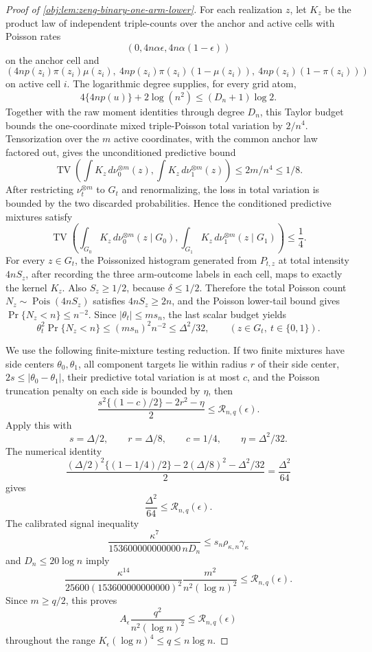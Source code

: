 \begin{proof}[Proof of \cref{obj:lem:zeng-binary-one-arm-lower}]
For each realization \(z\), let \(K_z\) be the product law of independent triple-counts over the anchor and active cells with Poisson rates
\[
(0,4n\alpha\epsilon,4n\alpha(1-\epsilon))
\]
on the anchor cell and
\[
(4n p(z_i)\pi(z_i)\mu(z_i),\ 4n p(z_i)\pi(z_i)(1-\mu(z_i)),\ 4n p(z_i)(1-\pi(z_i)))
\]
on active cell \(i\).  The logarithmic degree supplies, for every grid atom,
\[
4\{4n p(u)\}+2\log(n^2)
\le (D_n+1)\log 2 .
\]
Together with the raw moment identities through degree \(D_n\), this Taylor budget bounds the one-coordinate mixed triple-Poisson total variation by \(2/n^4\).  Tensorization over the \(m\) active coordinates, with the common anchor law factored out, gives the unconditioned predictive bound
\[
\operatorname{TV}\left(
\int K_z\,d\nu_0^{\otimes m}(z),
\int K_z\,d\nu_1^{\otimes m}(z)
\right)
\le 2m/n^4\le 1/8 .
\]
After restricting \(\nu_t^{\otimes m}\) to \(G_t\) and renormalizing, the loss in total variation is bounded by the two discarded probabilities.  Hence the conditioned predictive mixtures satisfy
\[
\operatorname{TV}\left(
\int_{G_0} K_z\,d\nu_0^{\otimes m}(z\mid G_0),
\int_{G_1} K_z\,d\nu_1^{\otimes m}(z\mid G_1)
\right)
\le \frac14 .
\]
For every \(z\in G_t\), the Poissonized histogram generated from \(P_{t,z}\) at total intensity \(4nS_z\), after recording the three arm-outcome labels in each cell, maps to exactly the kernel \(K_z\).  Also \(S_z\ge1/2\), because \(\delta\le1/2\).  Therefore the total Poisson count \(N_z\sim\operatorname{Pois}(4nS_z)\) satisfies \(4nS_z\ge2n\), and the Poisson lower-tail bound gives \(\Pr\{N_z<n\}\le n^{-2}\).  Since \(|\theta_t|\le m s_n\), the last scalar budget yields
\[
\theta_t^2\Pr\{N_z<n\}
\le
(m s_n)^2 n^{-2}
\le
\Delta^2/32,
\qquad (z\in G_t,
\ t\in\{0,1\}).
\]

We use the following finite-mixture testing reduction.  If two finite mixtures have side centers \(\theta_0,\theta_1\), all component targets lie within radius \(r\) of their side center, \(2s\le |\theta_0-\theta_1|\), their predictive total variation is at most \(c\), and the Poisson truncation penalty on each side is bounded by \(\eta\), then
\[
\frac{s^2\{(1-c)/2\}-2r^2-\eta}{2}
\le
\mathcal R_{n,q}(\epsilon).
\]
Apply this with
\[
s=\Delta/2,
\qquad
r=\Delta/8,
\qquad
c=1/4,
\qquad
\eta=\Delta^2/32 .
\]
The numerical identity
\[
\frac{(\Delta/2)^2\{(1-1/4)/2\}-2(\Delta/8)^2-\Delta^2/32}{2}
=\frac{\Delta^2}{64}
\]
gives
\[
\frac{\Delta^2}{64}
\le
\mathcal R_{n,q}(\epsilon).
\]
The calibrated signal inequality
\[
\frac{\kappa^7}{153600000000000\, nD_n}
\le s_n\rho_{\kappa,n}\gamma_\kappa
\]
and \(D_n\le20\log n\) imply
\[
\frac{\kappa^{14}}{25600(153600000000000)^2}
\frac{m^2}{n^2(\log n)^2}
\le \mathcal R_{n,q}(\epsilon).
\]
Since \(m\ge q/2\), this proves
\[
A_\epsilon\frac{q^2}{n^2(\log n)^2}
\le \mathcal R_{n,q}(\epsilon)
\]
throughout the range \(K_\epsilon(\log n)^4\le q\le n\log n\).


\end{proof}
